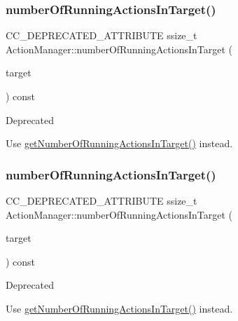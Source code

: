 \subsubsection{\texorpdfstring{number\+Of\+Running\+Actions\+In\+Target()}{numberOfRunningActionsInTarget()}\hspace{0.1cm}{\footnotesize\ttfamily [1/2]}}
{\footnotesize\ttfamily C\+C\+\_\+\+D\+E\+P\+R\+E\+C\+A\+T\+E\+D\+\_\+\+A\+T\+T\+R\+I\+B\+U\+TE ssize\+\_\+t Action\+Manager\+::number\+Of\+Running\+Actions\+In\+Target (\begin{DoxyParamCaption}\item[{\hyperlink{classNode}{Node} $\ast$}]{target }\end{DoxyParamCaption}) const\hspace{0.3cm}{\ttfamily [inline]}}

\begin{DoxyRefDesc}{Deprecated}
\item[\hyperlink{deprecated__deprecated000017}{Deprecated}]Use \hyperlink{classActionManager_add35fb2d5810bec63b59f432830746bc}{get\+Number\+Of\+Running\+Actions\+In\+Target()} instead. \end{DoxyRefDesc}
\mbox{\label{classActionManager_a9c8575014bda8867759c63aa17c519c3}} 
\subsubsection{\texorpdfstring{number\+Of\+Running\+Actions\+In\+Target()}{numberOfRunningActionsInTarget()}\hspace{0.1cm}{\footnotesize\ttfamily [2/2]}}
{\footnotesize\ttfamily C\+C\+\_\+\+D\+E\+P\+R\+E\+C\+A\+T\+E\+D\+\_\+\+A\+T\+T\+R\+I\+B\+U\+TE ssize\+\_\+t Action\+Manager\+::number\+Of\+Running\+Actions\+In\+Target (\begin{DoxyParamCaption}\item[{\hyperlink{classNode}{Node} $\ast$}]{target }\end{DoxyParamCaption}) const\hspace{0.3cm}{\ttfamily [inline]}}

\begin{DoxyRefDesc}{Deprecated}
\item[\hyperlink{deprecated__deprecated000247}{Deprecated}]Use \hyperlink{classActionManager_add35fb2d5810bec63b59f432830746bc}{get\+Number\+Of\+Running\+Actions\+In\+Target()} instead. \end{DoxyRefDesc}
\mbox{\label{classActionManager_aa98a62956dd3f0c7dad23e2a3cee2361}} 
